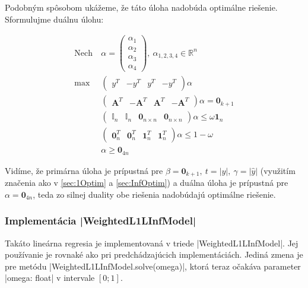 \documentclass[report.tex]{subfiles}
\begin{document}
Podobným spôsobom ukážeme, že táto úloha nadobúda optimálne riešenie. Sformulujme duálnu úlohu:

\begin{align*}
	\text{Nech}~&\alpha = \left(
	\begin{array}{c}
		\alpha_1 \\
		\hline
		\alpha_2 \\
		\hline
		\alpha_3 \\
		\hline
		\alpha_4
	\end{array}
	\right),~\alpha_{1,2,3,4} \in \mathbb{R}^n
	\\
	\text{max}~ &
	\left(
	\begin{array}{c|c|c|c}
		y^T & -y^T & y^T & -y^T
	\end{array}
	\right)
	\alpha \\
	&\left(
	\begin{array}{c|c|c|c}
		\mathbf{A}^T & -\mathbf{A}^T & \mathbf{A}^T & -\mathbf{A}^T
	\end{array}
	\right)
	\alpha
	=
	\mathbf{0}_{k+1} \\
	&\left(
	\begin{array}{c|c|c|c}
		\mathbb{I}_n & \mathbb{I}_n & \mathbf{0}_{n \times n} & \mathbf{0}_{n \times n}
	\end{array}
	\right)
	\alpha
	\leq
	\omega \mathbf{1}_{n} \\
	&\left(
	\begin{array}{c|c|c|c}
		\mathbf{0}_n^T & \mathbf{0}_n^T & \mathbf{1}_{n}^T & \mathbf{1}_{n}^T
	\end{array}
	\right)
	\alpha
	\leq
	1-\omega\\
	&\alpha \geq \mathbf{0}_{4n} 
\end{align*}

Vidíme, že primárna úloha je prípustná pre $\beta = \mathbf{0}_{k+1},~t=|y|,~\gamma=|\hat{y}|$ (využitím značenia ako v \ref{sec:1Optim} a \ref{sec:InfOptim}) a duálna úloha je prípustná pre $\alpha = \mathbf{0}_{4n}$, teda zo silnej duality obe riešenia nadobúdajú optimálne riešenie.

\newpage

\subsubsection{Implementácia \pyth|WeightedL1LInfModel|}

Takáto lineárna regresia je implementovaná v triede \pyth|WeightedL1LInfModel|. Jej používanie je rovnaké ako pri predchádzajúcich implementáciách. Jediná zmena je pre metódu \pyth|WeightedL1LInfModel.solve(omega)|, ktorá teraz očakáva parameter \pyth|omega: float| v intervale $[0;1]$.
\end{document}
